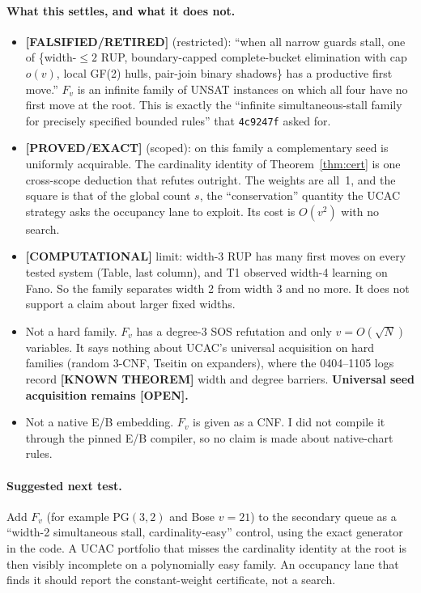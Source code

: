 \documentclass[11pt]{article}
\theoremstyle{definition}
\theoremstyle{remark}
\newcommand{\lab}[1]{\textbf{[#1]}}
\begin{document}
\paragraph{What this settles, and what it does not.}
\begin{itemize}
\item \lab{FALSIFIED/RETIRED} (restricted): ``when all narrow guards stall, one of
\{width-$\le2$ RUP, boundary-capped complete-bucket elimination with cap $o(v)$, local
GF(2) hulls, pair-join binary shadows\} has a productive first move.'' $F_v$ is an
infinite family of UNSAT instances on which all four have no first move at the root.
This is exactly the ``infinite simultaneous-stall family for precisely specified bounded
rules'' that \texttt{4c9247f} asked for.
\item \lab{PROVED/EXACT} (scoped): on this family a complementary seed is uniformly
acquirable. The cardinality identity of Theorem~\ref{thm:cert} is one cross-scope
deduction that refutes outright. The weights are all~1, and the square is that of the
global count $s$, the ``conservation'' quantity the UCAC strategy asks the occupancy lane
to exploit. Its cost is $O(v^2)$ with no search.
\item \lab{COMPUTATIONAL} limit: width-3 RUP has many first moves on every tested system
(Table, last column), and T1 observed width-4 learning on Fano. So the family separates
width 2 from width 3 and no more. It does not support a claim about larger fixed widths.
\item Not a hard family. $F_v$ has a degree-3 SOS refutation and only $v=O(\sqrt N)$
variables. It says nothing about UCAC's universal acquisition on hard families (random
3-CNF, Tseitin on expanders), where the 0404--1105 logs record \lab{KNOWN THEOREM} width and
degree barriers. \textbf{Universal seed acquisition remains \lab{OPEN}.}
\item Not a native E/B embedding. $F_v$ is given as a CNF. I did not compile it through
the pinned E/B compiler, so no claim is made about native-chart rules.
\end{itemize}
\paragraph{Suggested next test.} Add $F_v$ (for example PG$(3,2)$ and Bose $v=21$) to the
secondary queue as a ``width-2 simultaneous stall, cardinality-easy'' control, using the
exact generator in the code. A UCAC portfolio that misses the cardinality identity at the
root is then visibly incomplete on a polynomially easy family. An occupancy lane that finds
it should report the constant-weight certificate, not a search.
\end{document}
